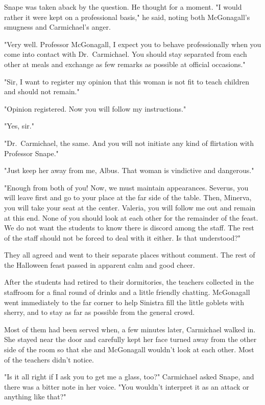 Snape was taken aback by the question. He thought for a moment. "I would rather it were kept on a professional basis," he said, noting both McGonagall's smugness and Carmichael's anger.

"Very well. Professor McGonagall, I expect you to behave professionally when you come into contact with Dr.~Carmichael. You should stay separated from each other at meals and exchange as few remarks as possible at official occasions."

"Sir, I want to register my opinion that this woman is not fit to teach children and should not remain."

"Opinion registered. Now you will follow my instructions."

"Yes, sir."

"Dr.~Carmichael, the same. And you will not initiate any kind of flirtation with Professor Snape."

"Just keep her away from me, Albus. That woman is vindictive and dangerous."

"Enough from both of you! Now, we must maintain appearances. Severus, you will leave first and go to your place at the far side of the table. Then, Minerva, you will take your seat at the center. Valeria, you will follow me out and remain at this end. None of you should look at each other for the remainder of the feast. We do not want the students to know there is discord among the staff. The rest of the staff should not be forced to deal with it either. Is that understood?"

They all agreed and went to their separate places without comment. The rest of the Halloween feast passed in apparent calm and good cheer.

After the students had retired to their dormitories, the teachers collected in the staffroom for a final round of drinks and a little friendly chatting. McGonagall went immediately to the far corner to help Sinistra fill the little goblets with sherry, and to stay as far as possible from the general crowd.

Most of them had been served when, a few minutes later, Carmichael walked in. She stayed near the door and carefully kept her face turned away from the other side of the room so that she and McGonagall wouldn't look at each other. Most of the teachers didn't notice.

"Is it all right if I ask you to get me a glass, too?" Carmichael asked Snape, and there was a bitter note in her voice. "You wouldn't interpret it as an attack or anything like that?"

